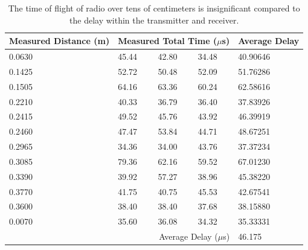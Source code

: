 \documentclass{article}
\begin{document}
    \begin{table}[H]
      \begin{tabular}{|l|l|l|l|l|}
        \hline
        Measured Distance (m) & \multicolumn{3}{|l|}{Measured Total Time ($\mu$s)} & Average Delay \\
        \hline
        0.0630 & 45.44 & 42.80 & 34.48 & 40.90646 \\
        0.1425 & 52.72 & 50.48 & 52.09 & 51.76286 \\
        0.1505 & 64.16 & 63.36 & 60.24 & 62.58616 \\
        0.2210 & 40.33 & 36.79 & 36.40 & 37.83926 \\
        0.2415 & 49.52 & 45.76 & 43.92 & 46.39919 \\
        0.2460 & 47.47 & 53.84 & 44.71 & 48.67251 \\
        0.2965 & 34.36 & 34.00 & 43.76 & 37.37234 \\
        0.3085 & 79.36 & 62.16 & 59.52 & 67.01230 \\
        0.3390 & 39.92 & 57.27 & 38.96 & 45.38220 \\
        0.3770 & 41.75 & 40.75 & 45.53 & 42.67541 \\
        0.3600 & 38.40 & 38.40 & 37.68 & 38.15880 \\
        0.0070 & 35.60 & 36.08 & 34.32 & 35.33331 \\
        \hline
        \multicolumn{4}{|r|}{Average Delay ($\mu$s)} & 46.175 \\
        \hline
      \end{tabular}
      \caption{The time of flight of radio over tens of centimeters is insignificant compared to the delay within the transmitter and receiver.}
      \label{table:rf-rx-tx}
    \end{table}



\end{document}
